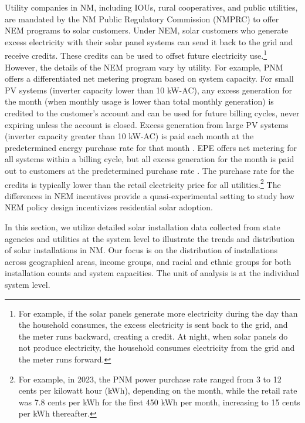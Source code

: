 \documentclass[11pt,twoside,letterpaper]{article}
\begin{document}
Utility companies in NM, including IOUs, rural cooperatives, and public utilities, are mandated by the NM Public Regulatory Commission (NMPRC) to offer NEM programs to solar customers. Under NEM, solar customers who generate excess electricity with their solar panel systems can send it back to the grid and receive credits. These credits can be used to offset future electricity use.\footnote{For example, if the solar panels generate more electricity during the day than the household consumes, the excess electricity is sent back to the grid, and the meter runs backward, creating a credit. At night, when solar panels do not produce electricity, the household consumes electricity from the grid and the meter runs forward.} However, the details of the NEM program vary by utility. For example, PNM offers a differentiated net metering program based on system capacity. For small PV systems (inverter capacity lower than 10 kW-AC), any excess generation for the month (when monthly usage is lower than total monthly generation) is credited to the customer’s account and can be used for future billing cycles, never expiring unless the account is closed. Excess generation from large PV systems (inverter capacity greater than 10 kW-AC) is paid each month at the predetermined energy purchase rate for that month \parencite{pnmnet}. EPE offers net metering for all systems within a billing cycle, but all excess generation for the month is paid out to customers at the predetermined purchase rate \parencite{epenet, epenetmid}. The purchase rate for the credits is typically lower than the retail electricity price for all utilities.\footnote{For example, in 2023, the PNM power purchase rate ranged from 3 to 12 cents per kilowatt hour (kWh), depending on the month, while the retail rate was 7.8 cents per kWh for the first 450 kWh per month, increasing to 15 cents per kWh thereafter.} The differences in NEM incentives provide a quasi-experimental setting to study how NEM policy design incentivizes residential solar adoption. 


In this section, we utilize detailed solar installation data collected from state agencies and utilities at the system level to illustrate the trends and distribution of solar installations in NM. Our focus is on the distribution of installations across geographical areas, income groups, and racial and ethnic groups for both installation counts and system capacities. The unit of analysis is at the individual system level.
\end{document}

